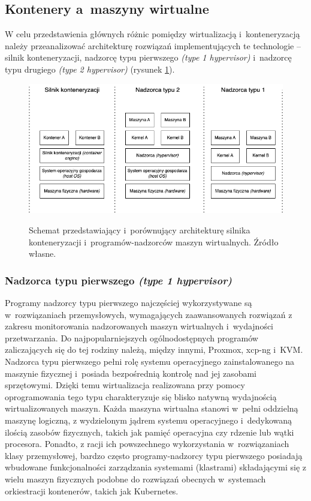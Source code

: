 \subsection{Kontenery a~maszyny wirtualne}
W celu przedstawienia głównych różnic pomiędzy wirtualizacją i~konteneryzacją należy przeanalizować architekturę rozwiązań implementujących te technologie -- silnik konteneryzacji, nadzorcę typu pierwszego \textit{(type 1 hypervisor)} i~nadzorcę typu drugiego \textit{(type 2 hypervisor)} (rysunek \ref{diagramWirtualizacja}).

\begin{figure}[!h]
	\begin{center}
		\resizebox{0.7\textwidth}{!} {
			\includegraphics{img/4/wirtualizacja.png}
		}
		\caption[Porównanie silnika konteneryzacji i~programów-nadzorców]{Schemat przedstawiający i~porównujący architekturę silnika konteneryzacji i~programów-nadzorców maszyn wirtualnych. Źródło własne.}
		\label{diagramWirtualizacja}
	\end{center}
\end{figure}

\subsubsection{Nadzorca typu pierwszego \textit{(type 1 hypervisor)}}
Programy nadzorcy typu pierwszego najczęściej wykorzystywane są w~rozwiązaniach przemysłowych, wymagających zaawansowanych rozwiązań z zakresu monitorowania nadzorowanych maszyn wirtualnych i~wydajności przetwarzania. Do najpopularniejszych ogólnodostępnych programów zaliczających się do tej rodziny należą, między innymi, Proxmox, xcp-ng i~KVM. Nadzorca typu pierwszego pełni rolę systemu operacyjnego zainstalowanego na maszynie fizycznej i~posiada bezpośrednią kontrolę nad jej zasobami sprzętowymi. Dzięki temu wirtualizacja realizowana przy pomocy oprogramowania tego typu charakteryzuje się blisko natywną wydajnością wirtualizowanych maszyn. Każda maszyna wirtualna stanowi w~pełni oddzielną maszynę logiczną, z wydzielonym jądrem systemu operacyjnego i~dedykowaną ilością zasobów fizycznych, takich jak pamięć operacyjna czy rdzenie lub wątki procesora. Ponadto, z racji ich powszechnego wykorzystania w~rozwiązaniach klasy przemysłowej, bardzo często programy-nadzorcy typu pierwszego posiadają wbudowane funkcjonalności zarządzania systemami (klastrami) składającymi się z wielu maszyn fizycznych podobne do rozwiązań obecnych w~systemach orkiestracji kontenerów, takich jak Kubernetes.


